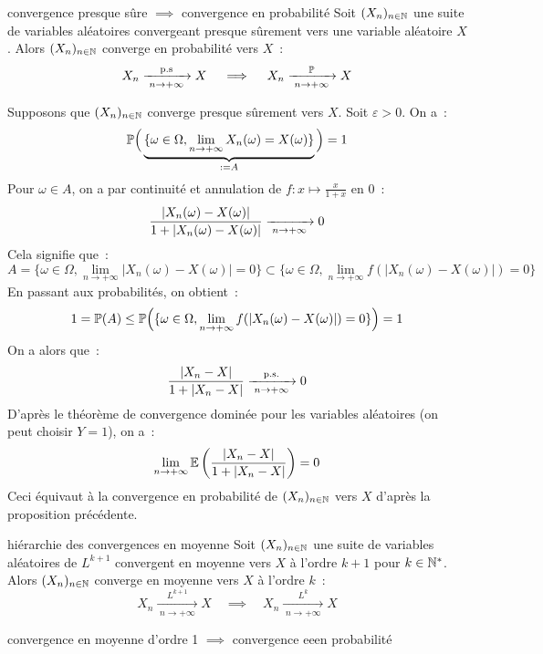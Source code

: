 \begin{proposition}{}{convergence presque sûre $\implies$ convergence en probabilité}
    Soit $(X_n)_{n \in \mathbb{N}}$ une suite de variables aléatoires convergeant presque sûrement vers une variable aléatoire $X$. Alors $(X_n)_{n \in \mathbb{N}}$ converge en probabilité vers $X$~:
    $$X_n \xrightarrow[\;n \to +\infty\;]{\mathrm{p.s}} X \quad\implies\quad X_n \xrightarrow[\;n \to +\infty\;]{\mathbb{P}} X$$
\end{proposition}

\begin{demonstration}
    Supposons que $(X_n)_{n \in \mathbb{N}}$ converge presque sûrement vers $X$. Soit $\varepsilon > 0$. On a~:
    $$\mathbb{P}\Big(\underbrace{\{\omega \in \Omega, \lim_{n \to +\infty} X_n(\omega) = X(\omega)\}}_{:=A}\Big) = 1$$
    Pour $\omega \in A$, on a par continuité et annulation de $f:x\mapsto \frac{x}{1+x}$ en $0$~:
    $$\frac{\vert X_n(\omega)-X(\omega)\vert}{1 + \vert X_n(\omega) - X(\omega)\vert} \xrightarrow[\;n \to + \infty\;]{} 0$$
    Cela signifie que~:
        $$A = \{\omega \in \Omega, \lim_{n \to +\infty} \vert X_n(\omega) -  X(\omega)\vert = 0\}  \subset \{\omega \in \Omega, \lim_{n \to +\infty} f(\vert X_n(\omega) -  X(\omega)\vert) = 0\}$$
    En passant aux probabilités, on obtient~:
    $$1 = \mathbb{P}(A) \leq \mathbb{P}\Big(\{\omega \in \Omega, \lim_{n \to +\infty} f(\vert X_n(\omega) -  X(\omega)\vert) = 0\}\Big) = 1$$
    On a alors que~:
    $$\frac{\vert X_n-X\vert}{1 + \vert X_n - X\vert} \xrightarrow[\;n \to +\infty\;]{\mathrm{p.s.}} 0$$
    D'après le théorème de convergence dominée pour les variables aléatoires (on peut choisir $Y=1$), on a~:
    $$\lim_{n \to +\infty} \mathbb{E}\left(\frac{\vert X_n - X\vert}{1 + \vert X_n - X\vert}\right) = 0$$
    Ceci équivaut à la convergence en probabilité de $(X_n)_{n \in \mathbb{N}}$ vers $X$ d'après la proposition précédente.
\end{demonstration}

\begin{theoreme}{}{hiérarchie des convergences en moyenne}
    Soit $(X_n)_{n \in \mathbb{N}}$ une suite de variables aléatoires de $L^{k+1}$ convergent en moyenne vers $X$ à l'ordre $k+1$ pour $k \in \mathbb{N}^*$. Alors $(X_n)_{n \in \mathbb{N}}$ converge en moyenne vers $X$ à l'ordre $k$~:
    $$X_n \xrightarrow[\;n \to +\infty\;]{L^{k+1}} X \quad\implies\quad X_n \xrightarrow[\;n \to +\infty\;]{L^k} X$$
\end{theoreme}

\begin{theoreme}{}{convergence en moyenne d'ordre 1 $\implies$ convergence eeen probabilité}
    
\end{theoreme}

